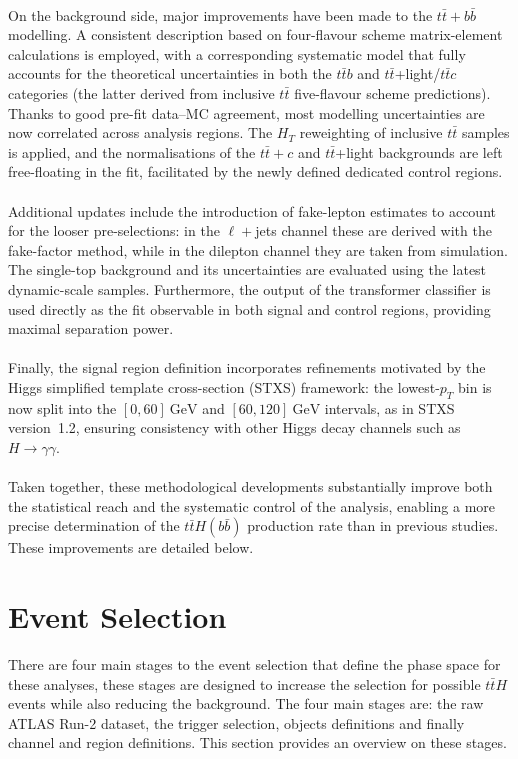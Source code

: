 \\
On the background side, major improvements have been made to the $t\bar{t}+b\bar{b}$ modelling. A consistent description based on four-flavour scheme matrix-element calculations is employed, with a corresponding systematic model that fully accounts for the theoretical uncertainties in both the $t\bar{t}b$ and $t\bar{t}$+light/$t\bar{t}c$ categories (the latter derived from inclusive $t\bar{t}$ five-flavour scheme predictions). Thanks to good pre-fit data–MC agreement, most modelling uncertainties are now correlated across analysis regions. The $H_{T}$ reweighting of inclusive $t\bar{t}$ samples is applied, and the normalisations of the $t\bar{t}+c$ and $t\bar{t}$+light backgrounds are left free-floating in the fit, facilitated by the newly defined dedicated control regions.\\
\\
Additional updates include the introduction of fake-lepton estimates to account for the looser pre-selections: in the $\ell+$jets channel these are derived with the fake-factor method, while in the dilepton channel they are taken from simulation. The single-top background and its uncertainties are evaluated using the latest dynamic-scale samples. Furthermore, the output of the transformer classifier is used directly as the fit observable in both signal and control regions, providing maximal separation power.\\
\\
Finally, the signal region definition incorporates refinements motivated by the Higgs simplified template cross-section (STXS) framework: the lowest-$p_{T}$ bin is now split into the $[0,60]~\text{GeV}$ and $[60,120]~\text{GeV}$ intervals, as in STXS version~1.2, ensuring consistency with other Higgs decay channels such as $H\to\gamma\gamma$.\\
\\
Taken together, these methodological developments substantially improve both the statistical reach and the systematic control of the analysis, enabling a more precise determination of the $t\bar{t}H(b\bar{b})$ production rate than in previous studies. These improvements are detailed below. 




\section{Event Selection}
There are four main stages to the event selection that define the phase space for these analyses, these stages are designed to increase the selection for possible $t\bar{t}H$ events while also reducing the background. The four main stages are: the raw ATLAS Run-2 dataset, the trigger selection, objects definitions and finally channel and region definitions. This section provides an overview on these stages.

